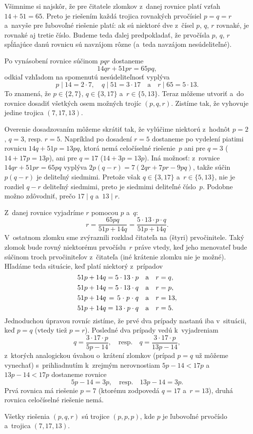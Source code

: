 {%
Všimnime si najskôr, že pre čitatele zlomkov z~danej rovnice platí
vzťah $14+51=65$. Preto je riešením každá trojica rovnakých
prvočísiel $p=q=r$ a~navyše pre ľubovoľné riešenie platí: ak sú
niektoré dve z~čísel $p$, $q$, $r$ rovnaké, je rovnaké aj tretie
číslo. Budeme teda ďalej predpokladať, že prvočísla $p$, $q$, $r$
spĺňajúce danú rovnicu sú navzájom rôzne (a~teda navzájom
nesúdeliteľné).

Po vynásobení rovnice súčinom $pqr$ dostaneme
$$
14qr+51pr=65pq,
$$
odkiaľ vzhľadom na spomenutú nesúdeliteľnosť vyplýva
$$
p\mid 14=2\cdot7,\quad q\mid51=3\cdot17\quad\text{a}\quad
r\mid65=5\cdot13.
$$
To znamená, že $p\in\{2,7\}$, $q\in\{3,17\}$ a~$r\in\{5,13\}$.
Teraz môžeme utvoriť a~do rovnice dosadiť všetkých osem možných
trojíc $(p,q,r)$. Zistíme tak, že vyhovuje jedine trojica
$(7,17,13)$.

\smallskip
Overenie dosadzovaním môžeme skrátiť tak, že vylúčime niektorú
z~hodnôt $p=2$, $q=3$, resp. $r=5$. Napríklad po dosadení $r=5$
dostaneme po vydelení piatimi rovnicu $14q+51p=13pq$, ktorá nemá
celočíselné riešenie~$p$ ani pre $q=3$ ($14+17p=13p$), ani pre
$q=17$ ($14+3p=13p$). Iná možnosť: z~rovnice $14qr+51pr=65pq$
vyplýva $2p(q-r)=7(2qr+7pr-9pq)$, takže súčin $p(q-r)$ je
deliteľný siedmimi. Pretože však $q\in\{3,17\}$ a~$r\in\{5,13\}$,
nie je rozdiel $q-r$ deliteľný siedmimi, preto je siedmimi
deliteľné číslo~$p$. Podobne možno zdôvodniť, prečo $17\mid q$
a~$13\mid r$.

\ineriesenie
Z~danej rovnice vyjadríme $r$ pomocou $p$ a~$q$:
$$
r=\frac{65pq}{51p+14q}=\frac{5\cdot13\cdot p\cdot q}{51p+14q}.
$$
V~ostatnom zlomku sme zvýraznili rozklad čitateľa na (štyri)
prvočinitele. Taký zlomok bude rovný niektorému prvočíslu~$r$ práve
vtedy, keď jeho menovateľ bude súčinom troch prvočiniteľov z~čitateľa
(iné krátenie zlomku nie je možné).
Hľadáme teda situácie, keď platí niektorý z~prípadov
$$
\vcenter{\let\\=\cr \openup\jot
\halign{\hss$#$&${}#$&#&$#$&$#$&${}#$\hss\cr
51p+14q&= 5\cdot13\cdot p&\quad&\text{a}&\quad r&=q,\\
51p+14q&= 5\cdot13\cdot q&\quad&\text{a}&\quad r&=p,\\
51p+14q&= 5\cdot p\cdot q&\quad&\text{a}&\quad r&=13,\\
51p+14q&=13\cdot p\cdot q&\quad&\text{a}&\quad r&=5.\cr
}}
$$
Jednoduchou úpravou rovníc zistíme, že prvé dva prípady nastanú
iba v~situácii, keď $p=q$ (vtedy tiež $p=r$).
Posledné dva prípady vedú k~vyjadreniam
$$
q=\frac{3\cdot17\cdot p}{5p-14},\quad\text{resp.}\quad
q=\frac{3\cdot17\cdot p}{13p-14},
$$
z~ktorých analogickou úvahou o~krátení zlomkov (prípad $p=q$ už
môžeme vynechať) s~prihliadnutím k~zrejmým nerovnostiam $5p-14<17p$
a~$13p-14<17p$ dostaneme rovnice
$$
5p-14=3p,\quad\text{resp.}\quad 13p-14=3p.
$$
Prvá rovnica má riešenie $p=7$ (ktorému zodpovedá $q=17$ a~$r=13$),
druhá rovnica celočíselné riešenie nemá.

\odpoved
Všetky riešenia $(p,q,r)$ sú trojice $(p,p,p)$,
kde $p$ je ľubovoľné prvočíslo a~trojica $(7,17,13)$.}


